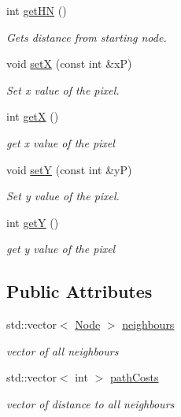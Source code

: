 \begin{DoxyCompactItemize}
int \mbox{\hyperlink{classNode_a1f06c65654c6eada84f33e6cc75602a2}{get\+HN}} ()
\begin{DoxyCompactList}\small\item\em Gets distance from starting node. \end{DoxyCompactList}\item 
void \mbox{\hyperlink{classNode_a2331d220046d215d86c8cb810519c59e}{setX}} (const int \&xP)
\begin{DoxyCompactList}\small\item\em Set x value of the pixel. \end{DoxyCompactList}\item 
int \mbox{\hyperlink{classNode_a6c026e5d8c28591c6e2bd08c68619fd1}{getX}} ()
\begin{DoxyCompactList}\small\item\em get x value of the pixel \end{DoxyCompactList}\item 
void \mbox{\hyperlink{classNode_a68c4121658504e9bd66a95c35c01d58b}{setY}} (const int \&yP)
\begin{DoxyCompactList}\small\item\em Set y value of the pixel. \end{DoxyCompactList}\item 
int \mbox{\hyperlink{classNode_abab48a3f494994d4f456897f3372d3ae}{getY}} ()
\begin{DoxyCompactList}\small\item\em get y value of the pixel \end{DoxyCompactList}\end{DoxyCompactItemize}
\subsection*{Public Attributes}
\begin{DoxyCompactItemize}
\item 
\mbox{\label{classNode_a54be5e60515dda8ffe23855919e0da95}} 
std\+::vector$<$ \mbox{\hyperlink{classNode}{Node}} $>$ \mbox{\hyperlink{classNode_a54be5e60515dda8ffe23855919e0da95}{neighbours}}
\begin{DoxyCompactList}\small\item\em vector of all neighbours \end{DoxyCompactList}\item 
\mbox{\label{classNode_a2228cf395cd98e0adcab69d9961e8d60}} 
std\+::vector$<$ int $>$ \mbox{\hyperlink{classNode_a2228cf395cd98e0adcab69d9961e8d60}{path\+Costs}}
\begin{DoxyCompactList}\small\item\em vector of distance to all neighbours \end{DoxyCompactList}\end{DoxyCompactItemize}


